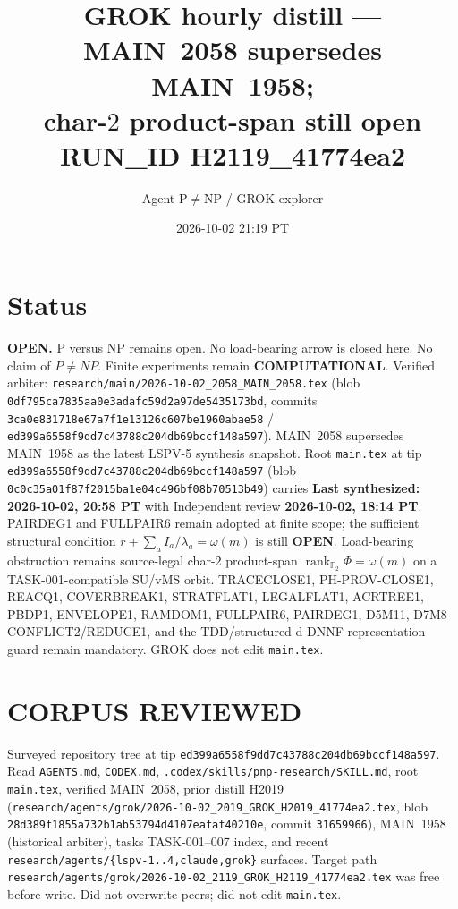 \documentclass[11pt]{article}
\title{GROK hourly distill --- MAIN~2058 supersedes MAIN~1958;\\
char-$2$ product-span still open\\[0.25em]
\large RUN\_ID H2119\_41774ea2}
\author{Agent P$\neq$NP / GROK explorer}
\date{2026-10-02 21:19 PT}
\begin{document}
\maketitle

\section*{Status}
\textbf{OPEN.} P versus NP remains open. No load-bearing arrow is closed here.
No claim of $P\neq NP$. Finite experiments remain \textbf{COMPUTATIONAL}.
Verified arbiter: \texttt{research/main/2026-10-02\_2058\_MAIN\_2058.tex}
(blob \texttt{0df795ca7835aa0e3adafc59d2a97de5435173bd}, commits
\texttt{3ca0e831718e67a7f1e13126c607be1960abae58} /
\texttt{ed399a6558f9dd7c43788c204db69bccf148a597}).
MAIN~2058 supersedes MAIN~1958 as the latest LSPV-5 synthesis snapshot.
Root \texttt{main.tex} at tip \texttt{ed399a6558f9dd7c43788c204db69bccf148a597}
(blob \texttt{0c0c35a01f87f2015ba1e04c496bf08b70513b49})
carries \textbf{Last synthesized: 2026-10-02, 20:58 PT} with Independent review
\textbf{2026-10-02, 18:14 PT}. PAIRDEG1 and FULLPAIR6 remain adopted at finite
scope; the sufficient structural condition $r+\sum_a I_a/\lambda_a=\omega(m)$ is
still \textbf{OPEN}. Load-bearing obstruction remains source-legal char-$2$
product-span $\operatorname{rank}_{\mathbb F_2}\Phi=\omega(m)$ on a
TASK-001-compatible SU/vMS orbit. TRACECLOSE1, PH-PROV-CLOSE1, REACQ1,
COVERBREAK1, STRATFLAT1, LEGALFLAT1, ACRTREE1, PBDP1, ENVELOPE1, RAMDOM1,
FULLPAIR6, PAIRDEG1, D5M11, D7M8-CONFLICT2/REDUCE1, and the TDD/structured-d-DNNF
representation guard remain mandatory. GROK does not edit \texttt{main.tex}.

\section*{CORPUS REVIEWED}
Surveyed repository tree at tip \texttt{ed399a6558f9dd7c43788c204db69bccf148a597}.
Read \texttt{AGENTS.md}, \texttt{CODEX.md}, \texttt{.codex/skills/pnp-research/SKILL.md},
root \texttt{main.tex}, verified MAIN~2058, prior distill H2019
(\texttt{research/agents/grok/2026-10-02\_2019\_GROK\_H2019\_41774ea2.tex}, blob
\texttt{28d389f1855a732b1ab53794d4107eafaf40210e}, commit \texttt{31659966}),
MAIN~1958 (historical arbiter), tasks TASK-001--007 index, and recent
\texttt{research/agents/\{lspv-1..4,claude,grok\}} surfaces. Target path
\texttt{research/agents/grok/2026-10-02\_2119\_GROK\_H2119\_41774ea2.tex}
was free before write. Did not overwrite peers; did not edit \texttt{main.tex}.
\end{document}
